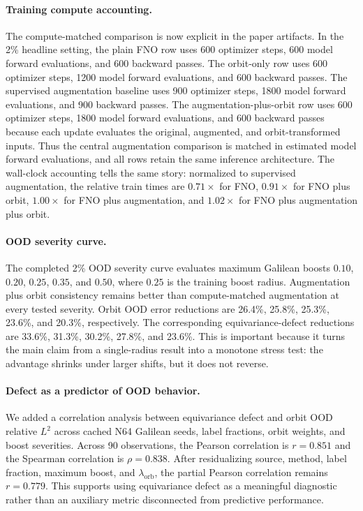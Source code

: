 \paragraph{Training compute accounting.} The compute-matched comparison is now explicit in the paper artifacts. In the 2\% headline setting, the plain FNO row uses 600 optimizer steps, 600 model forward evaluations, and 600 backward passes. The orbit-only row uses 600 optimizer steps, 1200 model forward evaluations, and 600 backward passes. The supervised augmentation baseline uses 900 optimizer steps, 1800 model forward evaluations, and 900 backward passes. The augmentation-plus-orbit row uses 600 optimizer steps, 1800 model forward evaluations, and 600 backward passes because each update evaluates the original, augmented, and orbit-transformed inputs. Thus the central augmentation comparison is matched in estimated model forward evaluations, and all rows retain the same inference architecture. The wall-clock accounting tells the same story: normalized to supervised augmentation, the relative train times are \(0.71\times\) for FNO, \(0.91\times\) for FNO plus orbit, \(1.00\times\) for FNO plus augmentation, and \(1.02\times\) for FNO plus augmentation plus orbit.

\paragraph{OOD severity curve.} The completed 2\% OOD severity curve evaluates maximum Galilean boosts \(0.10\), \(0.20\), \(0.25\), \(0.35\), and \(0.50\), where \(0.25\) is the training boost radius. Augmentation plus orbit consistency remains better than compute-matched augmentation at every tested severity. Orbit OOD error reductions are 26.4\%, 25.8\%, 25.3\%, 23.6\%, and 20.3\%, respectively. The corresponding equivariance-defect reductions are 33.6\%, 31.3\%, 30.2\%, 27.8\%, and 23.6\%. This is important because it turns the main claim from a single-radius result into a monotone stress test: the advantage shrinks under larger shifts, but it does not reverse.

\paragraph{Defect as a predictor of OOD behavior.} We added a correlation analysis between equivariance defect and orbit OOD relative \(L^2\) across cached N64 Galilean seeds, label fractions, orbit weights, and boost severities. Across 90 observations, the Pearson correlation is \(r=0.851\) and the Spearman correlation is \(\rho=0.838\). After residualizing source, method, label fraction, maximum boost, and \(\lambda_{\mathrm{orb}}\), the partial Pearson correlation remains \(r=0.779\). This supports using equivariance defect as a meaningful diagnostic rather than an auxiliary metric disconnected from predictive performance.

